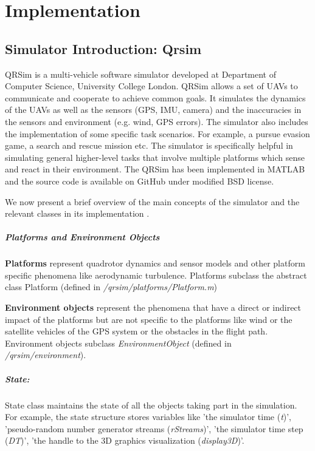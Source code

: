 \chapter{Implementation}

\section{Simulator Introduction: Qrsim}
QRSim \cite{denardi2013rn} is a multi-vehicle software simulator developed at Department of Computer Science, University College London. QRSim allows a set of UAVs to communicate and cooperate to achieve common goals. It simulates the dynamics of the UAVs as well as the sensors (GPS, IMU, camera) and the inaccuracies in the sensors and environment (e.g. wind, GPS errors). The simulator also includes the implementation of some specific task scenarios. For example, a pursue evasion game, a search and rescue mission etc. The simulator is specifically helpful in simulating general higher-level tasks that involve multiple platforms which sense and react in their environment. The QRSim has been implemented in MATLAB and the source code is available on GitHub \cite{qrsim_github} under modified BSD license.

We now present a brief overview of the main concepts of the simulator and the relevant classes in its implementation \cite{qrsim_github_manual}.

\paragraph{Platforms and Environment Objects}
\textbf{Platforms} represent quadrotor dynamics and sensor models and other platform specific phenomena like aerodynamic turbulence. Platforms subclass the abstract class Platform (defined in \emph{/qrsim/platforms/Platform.m})

\textbf{Environment objects} represent the phenomena that have a direct or indirect impact of the platforms but are not specific to the platforms like wind or the satellite vehicles of the GPS system or the obstacles in the flight path. Environment objects subclass \emph{EnvironmentObject} (defined in \emph{/qrsim/environment}).
\paragraph{State:} State class maintains the state of all the objects taking part in the simulation. For example, the state structure stores variables like 'the simulator time (\emph{t})', 'pseudo-random number generator streams (\emph{rStreams})', 'the simulator time step (\emph{DT})', 'the handle to the 3D graphics visualization (\emph{display3D})'.
